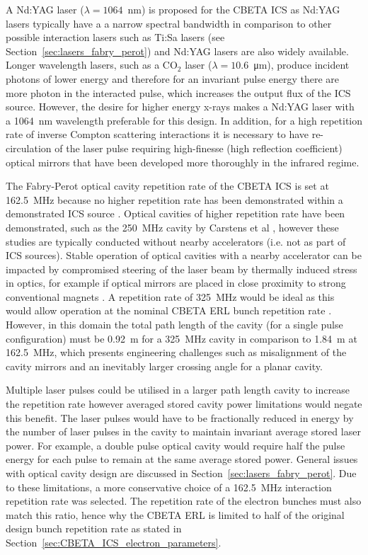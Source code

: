 \documentclass[../main.tex]{subfiles}
\begin{document}
A Nd:YAG laser ($\lambda = 1064$~\si{\nano\meter}) is proposed for the CBETA ICS as Nd:YAG lasers typically have a a narrow spectral bandwidth in comparison to other possible interaction lasers such as Ti:Sa lasers (see Section~\ref{sec:lasers_fabry_perot}) and Nd:YAG lasers are also widely available. Longer wavelength lasers, such as a CO$_{2}$ laser \cite{pogorelsky2020converting} ($\lambda = 10.6$~\si{\micro\meter}), produce incident photons of lower energy and therefore for an invariant pulse energy there are more photon in the interacted pulse, which increases the output flux of the ICS source. However, the desire for higher energy x-rays makes a Nd:YAG laser with a 1064~\si{\nano\meter} wavelength preferable for this design. In addition, for a high repetition rate of inverse Compton scattering interactions it is necessary to have re-circulation of the laser pulse requiring high-finesse (high reflection coefficient) optical mirrors that have been developed more thoroughly in the infrared regime. 

The Fabry-Perot optical cavity repetition rate of the CBETA ICS is set at 162.5~\si{\mega\hertz} because no higher repetition rate has been demonstrated within a demonstrated ICS source \cite{akagi2016narrow}. Optical cavities of higher repetition rate have been demonstrated, such as the 250~\si{\mega\hertz} cavity by Carstens et al \cite{carstens2014megawatt}, however these studies are typically conducted without nearby accelerators (i.e. not as part of ICS sources). Stable operation of optical cavities with a nearby accelerator can be impacted by compromised steering of the laser beam by thermally induced
stress in optics, for example if optical mirrors are placed in close
proximity to strong conventional magnets \cite{gunther2019device}. A repetition rate of 325~\si{\mega\hertz} would be ideal as this would allow operation at the nominal CBETA ERL bunch repetition rate \cite{hoffstaetter2017cbeta}. However, in this domain the total path length of the cavity (for a single pulse configuration) must be 0.92~\si{\meter} for a 325~\si{\mega\hertz} cavity in comparison to 1.84~\si{\meter} at 162.5~\si{\mega\hertz}, which presents engineering challenges such as misalignment of the cavity mirrors and an inevitably larger crossing angle for a planar cavity.

Multiple laser pulses could be utilised in a larger path length cavity to increase the repetition rate however averaged stored cavity power limitations would negate this benefit. The laser pulses would have to be fractionally reduced in energy by the number of laser pulses in the cavity to maintain invariant average stored laser power. For example, a double pulse optical cavity would require half the pulse energy for each pulse to remain at the same average stored power. General issues with optical cavity design are discussed in Section~\ref{sec:lasers_fabry_perot}. Due to these limitations, a more conservative choice of a 162.5~\si{\mega\hertz} interaction repetition rate was selected. The repetition rate of the electron bunches must also match this ratio, hence why the CBETA ERL is limited to half of the original design bunch repetition rate as stated in Section~\ref{sec:CBETA_ICS_electron_parameters}. 
\end{document}
